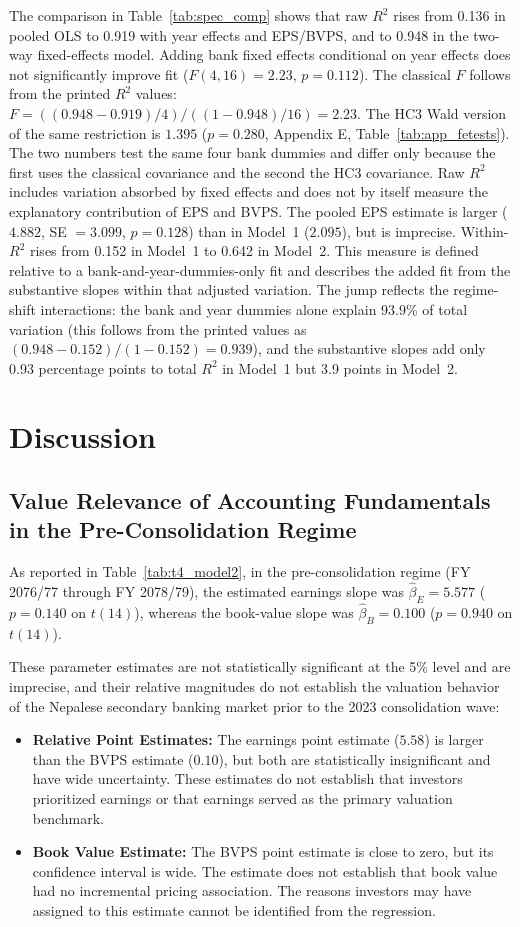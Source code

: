 The comparison in Table~\ref{tab:spec_comp} shows that raw $R^2$ rises from 0.136 in pooled OLS to 0.919 with year effects and EPS/BVPS, and to 0.948 in the two-way fixed-effects model. Adding bank fixed effects conditional on year effects does not significantly improve fit ($F(4,16)=2.23$, $p=0.112$). The classical $F$ follows from the printed $R^2$ values: $F = ((0.948-0.919)/4)/((1-0.948)/16) = 2.23$. The HC3 Wald version of the same restriction is $1.395$ ($p = 0.280$, Appendix E, Table~\ref{tab:app_fetests}). The two numbers test the same four bank dummies and differ only because the first uses the classical covariance and the second the HC3 covariance. Raw $R^2$ includes variation absorbed by fixed effects and does not by itself measure the explanatory contribution of EPS and BVPS. The pooled EPS estimate is larger ($4.882$, SE $=3.099$, $p=0.128$) than in Model~1 ($2.095$), but is imprecise. Within-$R^2$ rises from 0.152 in Model~1 to 0.642 in Model~2. This measure is defined relative to a bank-and-year-dummies-only fit and describes the added fit from the substantive slopes within that adjusted variation. The jump reflects the regime-shift interactions: the bank and year dummies alone explain 93.9\% of total variation (this follows from the printed values as $(0.948-0.152)/(1-0.152) = 0.939$), and the substantive slopes add only 0.93 percentage points to total $R^2$ in Model~1 but 3.9 points in Model~2.

\section{Discussion}

\subsection{Value Relevance of Accounting Fundamentals in the Pre-Consolidation Regime}
As reported in Table~\ref{tab:t4_model2}, in the pre-consolidation regime (FY 2076/77 through FY 2078/79), the estimated earnings slope was $\hat{\beta}_E = 5.577$ ($p = 0.140$ on $t(14)$), whereas the book-value slope was $\hat{\beta}_B = 0.100$ ($p = 0.940$ on $t(14)$).

These parameter estimates are not statistically significant at the 5\% level and are imprecise, and their relative magnitudes do not establish the valuation behavior of the Nepalese secondary banking market prior to the 2023 consolidation wave:
\begin{itemize}
    \item \textbf{Relative Point Estimates:} The earnings point estimate ($5.58$) is larger than the BVPS estimate ($0.10$), but both are statistically insignificant and have wide uncertainty. These estimates do not establish that investors prioritized earnings or that earnings served as the primary valuation benchmark.
    \item \textbf{Book Value Estimate:} The BVPS point estimate is close to zero, but its confidence interval is wide. The estimate does not establish that book value had no incremental pricing association. The reasons investors may have assigned to this estimate cannot be identified from the regression.
\end{itemize}

